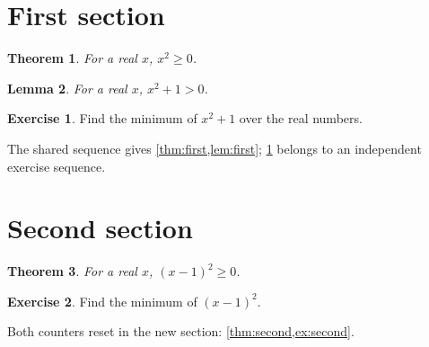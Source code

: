 \documentclass[11pt]{article}
\newtheorem{theorem}{Theorem}[section]
\newtheorem{lemma}[theorem]{Lemma}
\theoremstyle{definition}
\newtheorem{exercise}{Exercise}[section]
\begin{document}
\section{First section}
\begin{theorem}\label{thm:first}
For a real $x$, $x^2\ge0$.
\end{theorem}
\begin{lemma}\label{lem:first}
For a real $x$, $x^2+1>0$.
\end{lemma}
\begin{exercise}\label{ex:first}
Find the minimum of $x^2+1$ over the real numbers.
\end{exercise}
The shared sequence gives \cref{thm:first,lem:first};
\cref{ex:first} belongs to an independent exercise sequence.
\section{Second section}
\begin{theorem}\label{thm:second}
For a real $x$, $(x-1)^2\ge0$.
\end{theorem}
\begin{exercise}\label{ex:second}
Find the minimum of $(x-1)^2$.
\end{exercise}
Both counters reset in the new section:
\cref{thm:second,ex:second}.
\end{document}
